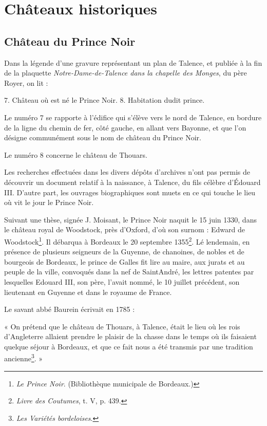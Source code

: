 
\section{Châteaux historiques}
\subsection{Château du Prince Noir}

Dans la légende d'une gravure représentant un plan de Talence, et publiée à la fin de la plaquette \textit{Notre-Dame-de-Talence dans la chapelle des Monges}, du père Royer, on lit : 

\begin{center}
7. Château où est né le Prince Noir.
8. Habitation dudit prince. 
\end{center}

Le numéro 7 se rapporte à l'édifice qui s'élève vers le nord de Talence, en bordure de la ligne du chemin de fer, côté gauche, en allant vers Bayonne, et que l'on désigne communément sous le nom de château du Prince Noir.

Le numéro 8 concerne le château de Thouars.

Les recherches effectuées dans les divers dépôts d'archives n'ont pas permis de découvrir un document relatif à la naissance, à Talence, du fils célèbre d'Édouard III. D'autre part, les ouvrages biographiques sont muets en ce qui touche le lieu où vit le jour le Prince Noir.

Suivant une thèse, signée J. Moisant, le Prince Noir naquit le 15 juin 1330, dans le château royal de Woodstock, près d'Oxford, d'où son surnom : Edward de Woodstock\footnote{\textit{Le Prince Noir}. (Bibliothèque municipale de Bordeaux.)}. Il débarqua à Bordeaux le 20 septembre 1355\footnote{\textit{Livre des Coutumes}, t. V, p. 439.}. Lé lendemain, en présence de plusieurs seigneurs de la Guyenne, de chanoines, de nobles et de bourgeois de Bordeaux, le prince de Galles fit lire au maire, aux jurats et au peuple de la ville, convoqués dans la nef de SaintAndré, les lettres patentes par lesquelles Edouard III, son père, l'avait nommé, le 10 juillet précédent, son lieutenant en Guyenne et dans le royaume de France.

Le savant abbé Baurein écrivait en 1785 : 

« On prétend que le château de Thouars, à Talence, était le lieu où les rois d'Angleterre allaient prendre le plaisir de la chasse dans le temps où ils faisaient quelque séjour à Bordeaux, et que ce fait nous a été transmis par une tradition ancienne\footnote{\textit{Les Variétés bordeloises}.}. »

